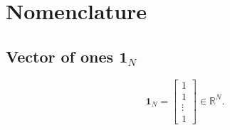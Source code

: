 \section{Nomenclature}

\subsection{Vector of ones $\mathbf{1}_N$}

\begin{equation}
\mathbf{1}_N =
\begin{bmatrix} 
1 \\ 
1 \\ 
\vdots \\ 
1 
\end{bmatrix} \in \mathbb{R}^N.
\end{equation}
